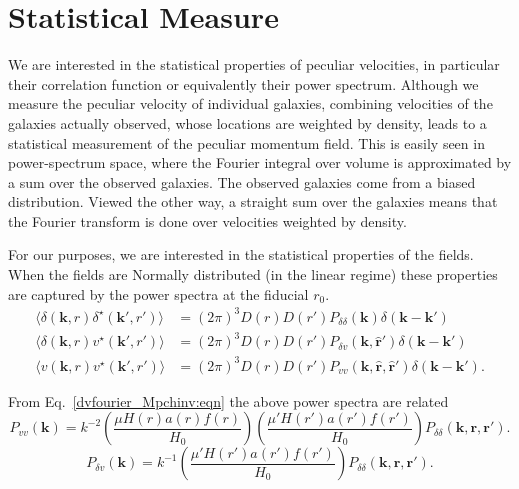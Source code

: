 \documentclass[11pt, oneside]{article}   	%
\begin{document}
\section{Statistical Measure}

We are interested in the statistical properties of peculiar velocities, in particular their correlation function or equivalently
their power spectrum.  Although we measure the peculiar velocity of individual galaxies, combining velocities of the galaxies
actually observed, whose locations are weighted by density, leads to a statistical measurement of the peculiar momentum field.
This is easily seen in power-spectrum space, where the Fourier integral over volume is approximated by a sum
over the observed galaxies.  The observed galaxies come from a biased distribution. Viewed the other way, a straight
sum over the galaxies means that the Fourier transform is done over velocities weighted by density.


For our purposes, we are interested in the statistical properties of the fields.  When the fields are Normally distributed
(in the linear regime) these properties are
captured by the power spectra at the fiducial $r_0$.
\begin{align}
\langle \delta(\mathbf{k},r)  \delta^{\star}(\mathbf{k'},r') \rangle &  = (2\pi)^3 D(r) D(r') P_{\delta \delta}(\mathbf{k}) \delta(\mathbf{k} -\mathbf{k'})\\ 
\langle \delta(\mathbf{k},r)  v^{\star}(\mathbf{k'},r') \rangle &  = (2\pi)^3 D(r) D(r') P_{\delta v}(\mathbf{k}, \mathbf{\hat{r}'}) \delta(\mathbf{k} -\mathbf{k'})\\ 
\langle v(\mathbf{k},r)  v^{\star}(\mathbf{k'},r') \rangle &  = (2\pi)^3 D(r) D(r') P_{vv}(\mathbf{k},  \mathbf{\hat{r}}, \mathbf{\hat{r}'}) \delta(\mathbf{k} -\mathbf{k'}).
\end{align}

From Eq.~\ref{dvfourier_Mpchinv:eqn} the above power spectra are related
\begin{equation}
 P_{vv}(\mathbf{k})  = k^{-2} \left( \frac{\mu H(r)a(r)f(r)}{H_0}\right)
 \left( \frac{\mu' H(r')a(r')f(r')}{H_0}\right)  P_{\delta\delta}(\mathbf{k},\mathbf{r},\mathbf{r'}).
\end{equation}
\begin{equation}
 P_{\delta v}(\mathbf{k})  = k^{-1}
 \left( \frac{\mu' H(r')a(r')f(r')}{H_0}\right)  P_{\delta\delta}(\mathbf{k},\mathbf{r},\mathbf{r'}).
\end{equation}
\end{document}
